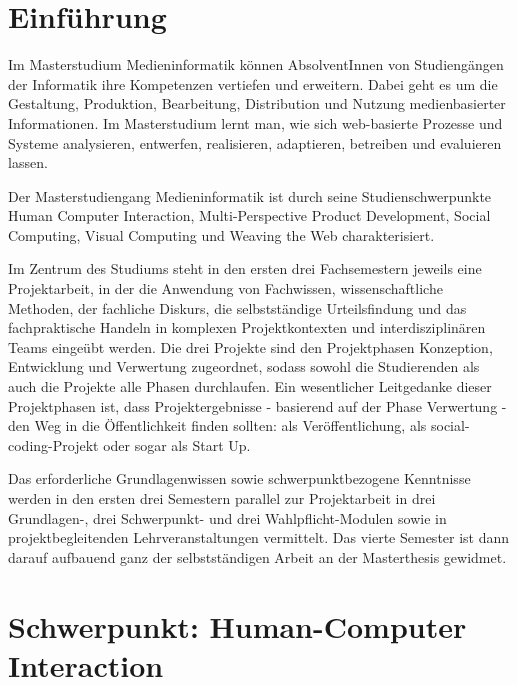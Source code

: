 \chapter{Einführung\label{/mi-2017/modulbeschreibungen-master/schwerpunkte-einfuehrung}}\label{einfuxfchrungpathlabelmi-2017modulbeschreibungen-masterschwerpunkte-einfuehrung}

Im Masterstudium Medieninformatik können AbsolventInnen von
Studiengängen der Informatik ihre Kompetenzen vertiefen und erweitern.
Dabei geht es um die Gestaltung, Produktion, Bearbeitung, Distribution
und Nutzung medienbasierter Informationen. Im Masterstudium lernt man,
wie sich web-basierte Prozesse und Systeme analysieren, entwerfen,
realisieren, adaptieren, betreiben und evaluieren lassen.

Der Masterstudiengang Medieninformatik ist durch seine
Studienschwerpunkte Human Computer Interaction, Multi-Perspective
Product Development, Social Computing, Visual Computing und Weaving the
Web charakterisiert.

Im Zentrum des Studiums steht in den ersten drei Fachsemestern jeweils
eine Projektarbeit, in der die Anwendung von Fachwissen,
wissenschaftliche Methoden, der fachliche Diskurs, die selbstständige
Urteilsfindung und das fachpraktische Handeln in komplexen
Projektkontexten und interdisziplinären Teams eingeübt werden. Die drei
Projekte sind den Projektphasen Konzeption, Entwicklung und Verwertung
zugeordnet, sodass sowohl die Studierenden als auch die Projekte alle
Phasen durchlaufen. Ein wesentlicher Leitgedanke dieser Projektphasen
ist, dass Projektergebnisse - basierend auf der Phase Verwertung - den
Weg in die Öffentlichkeit finden sollten: als Veröffentlichung, als
social-coding-Projekt oder sogar als Start Up.

Das erforderliche Grundlagenwissen sowie schwerpunktbezogene Kenntnisse
werden in den ersten drei Semestern parallel zur Projektarbeit in drei
Grundlagen-, drei Schwerpunkt- und drei Wahlpflicht-Modulen sowie in
projektbegleitenden Lehrveranstaltungen vermittelt. Das vierte Semester
ist dann darauf aufbauend ganz der selbstständigen Arbeit an der
Masterthesis gewidmet.

\chapter{Schwerpunkt: Human-Computer
Interaction\label{/mi-2017/modulbeschreibungen-master/schwerpunkt-human-computer-interaction}}\label{schwerpunkt-human-computer-interactionpathlabelmi-2017modulbeschreibungen-masterschwerpunkt-human-computer-interaction}

